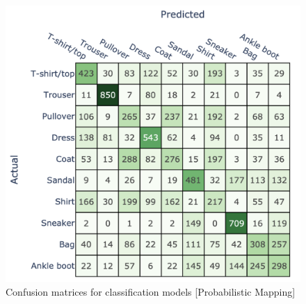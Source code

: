 \begin{figure}[!htb]
\begin{minipage}{0.33\textwidth}
    \end{minipage}\hfill
    \begin{minipage}{0.33\textwidth}
        \centering
        \includegraphics[width=1\linewidth]{images/CM_HybridPipeline_ProbabilisticMapping_CNN.png}
    \end{minipage}
    \caption{\footnotesize Confusion matrices for classification models [Probabilistic Mapping]}
    \label{fig:confusion_matrices_probabilistic}
\end{figure}

